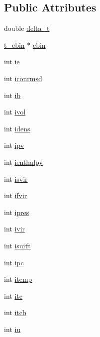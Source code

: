 \subsection*{\-Public \-Attributes}
\begin{DoxyCompactItemize}
\item 
double \hyperlink{structt__mdebin_a2f7cac88fe2c26ffa4bee5d55b1e2900}{delta\-\_\-t}
\item 
\hyperlink{structt__ebin}{t\-\_\-ebin} $\ast$ \hyperlink{structt__mdebin_a1f3031da94f48d7fa395c3aae8115bcb}{ebin}
\item 
int \hyperlink{structt__mdebin_a9ddd4bfe26a6cec86e65b3d4115f1e26}{ie}
\item 
int \hyperlink{structt__mdebin_abca603da4232ab6c4769d0ffeb7c2cad}{iconrmsd}
\item 
int \hyperlink{structt__mdebin_a340f4c87fb722149e1f6b3f8b71c66cb}{ib}
\item 
int \hyperlink{structt__mdebin_ad6ade22a5ff119ac0d4ee769a7dcec97}{ivol}
\item 
int \hyperlink{structt__mdebin_ad78949bfd295e858410e9a516b0dbe67}{idens}
\item 
int \hyperlink{structt__mdebin_aee19f078c7f733da5956c0d76a27bb63}{ipv}
\item 
int \hyperlink{structt__mdebin_a36d6e54d75e7e05d385f9647cfbe8b6d}{ienthalpy}
\item 
int \hyperlink{structt__mdebin_ae05f88753a4ef0407b1dbfae045c5ed0}{isvir}
\item 
int \hyperlink{structt__mdebin_a6a19207a92ee68b9f0dc7b16cdcbed32}{ifvir}
\item 
int \hyperlink{structt__mdebin_a979b38c9a1c71e3d1ee33c52e7b346d5}{ipres}
\item 
int \hyperlink{structt__mdebin_a1ff0684bd35854d4daef4ae94b345ccc}{ivir}
\item 
int \hyperlink{structt__mdebin_a5d69a44fbe6f5e58d1216cf9672d50e4}{isurft}
\item 
int \hyperlink{structt__mdebin_a3804a4fc913e626d5c3b78225ed10944}{ipc}
\item 
int \hyperlink{structt__mdebin_ae81850aba04cdbe7a12064ba2fdfa733}{itemp}
\item 
int \hyperlink{structt__mdebin_abb052226f96ff26050e2a1d6bc24257b}{itc}
\item 
int \hyperlink{structt__mdebin_a3b6a595cf5cf15007c9917af418001e9}{itcb}
\item 
int \hyperlink{structt__mdebin_af704dacbee8cfd361be1646ea8fd0f34}{iu}
\item 

\end{DoxyCompactItemize}
